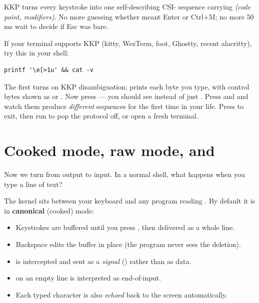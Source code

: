 \begin{idea}
KKP turns every keystroke into one self-describing CSI-
sequence carrying \emph{(code point, modifiers)}. No more guessing
whether  meant Enter or Ctrl+M; no more 50 ms wait to
decide if Esc was bare.
\end{idea}

\begin{tryit}
If your terminal supports KKP (kitty, WezTerm, foot, Ghostty, recent
alacritty), try this in your shell:
\begin{lstlisting}[style=shell]
printf '\e[>1u' && cat -v
\end{lstlisting}
The first  turns on KKP disambiguation; 
prints each byte you type, with control bytes shown as 
or . Now press  --- you should see
\code{\^{}[[13u} instead of just . Press 
and  and watch them produce \emph{different} sequences
for the first time in your life. Press  to exit, then
run \code{printf '\textbackslash{}e[<u'} to pop the protocol off,
or open a fresh terminal.
\end{tryit}


\section{Cooked mode, raw mode, and }

Now we turn from output to input. In a normal shell, what happens
when you type a line of text?

The kernel sits between your keyboard and any program reading
. By default it is in \textbf{canonical} (cooked) mode:

\begin{itemize}[leftmargin=*]
  \item Keystrokes are buffered until you press , then
    delivered as a whole line.
  \item Backspace edits the buffer in place (the program never sees
    the deletion).
  \item {} is intercepted and sent as a \emph{signal}
    () rather than as data.
  \item {} on an empty line is interpreted as
    end-of-input.
  \item Each typed character is also \emph{echoed} back to the
    screen automatically.
\end{itemize}

